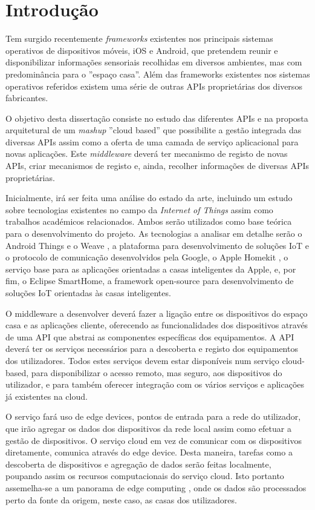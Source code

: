 \setcounter{page}{1}

\chapter{Introdução}
Tem surgido recentemente \textit{frameworks} existentes nos principais sistemas operativos de dispositivos móveis, iOS e Android, que pretendem reunir e disponibilizar informações sensoriais recolhidas em diversos ambientes, mas com predominância para o ''espaço casa''.
Além das frameworks existentes nos sistemas operativos referidos existem uma série de outras APIs proprietárias dos diversos fabricantes.

O objetivo desta dissertação consiste no estudo das diferentes APIs e na proposta arquitetural de um \textit{mashup} ''cloud based'' que possibilite a gestão integrada das diversas APIs assim como a oferta de uma camada de serviço aplicacional para novas aplicações.
Este \textit{middleware} deverá ter mecanismo de registo de novas APIs, criar mecanismos de registo e, ainda, recolher informações de diversas APIs proprietárias.
 
Inicialmente, irá ser feita uma análise do estado da arte, incluindo  um estudo sobre tecnologias existentes no campo da \textit{Internet of Things} assim como trabalhos académicos relacionados. Ambos serão utilizados como base teórica para o desenvolvimento do projeto. As tecnologias a analisar em detalhe serão o Android Things e o Weave \cite{android-things}, a plataforma para desenvolvimento de soluções IoT e o protocolo de comunicação desenvolvidos pela Google, o Apple Homekit \cite{homekit}, o serviço base para as aplicações orientadas a casas inteligentes da Apple, e, por fim, o Eclipse SmartHome, a framework open-source para desenvolvimento de soluções IoT orientadas às casas inteligentes.

O middleware a desenvolver deverá fazer a ligação entre os dispositivos do espaço casa e as aplicações cliente, oferecendo as funcionalidades dos dispositivos através de uma API que abstrai as componentes específicas dos equipamentos. A API deverá ter os serviços necessários para a descoberta e registo dos equipamentos dos utilizadores. Todos estes serviços devem estar disponíveis num serviço cloud-based, para disponibilizar o acesso remoto, mas seguro, aos dispositivos do utilizador, e para também oferecer integração com os vários serviços e aplicações já existentes na cloud.

O serviço fará uso de edge devices, pontos de entrada para a rede do utilizador, que irão agregar os dados dos dispositivos da rede local assim como efetuar a gestão de dispositivos. O serviço cloud em vez de comunicar com os dispositivos diretamente, comunica através do edge device. Desta maneira, tarefas como a descoberta de dispositivos e agregação de dados serão feitas localmente, poupando assim os recursos computacionais do serviço cloud. Isto portanto assemelha-se a um panorama de edge computing \cite{edge}, onde os dados são processados perto da fonte da origem, neste caso, as casas dos utilizadores.

